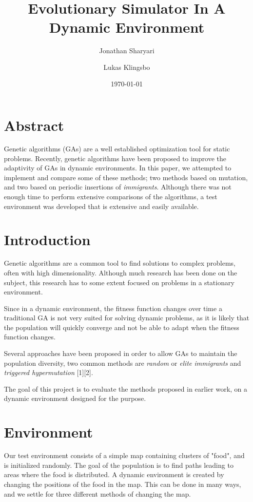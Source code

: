 \documentclass[a4paper,12pt]{article}
\title{\textbf{Evolutionary Simulator In A Dynamic Environment}}
\author{Jonathan Sharyari \and Lukas Klingsbo}  %
\date{\today}
\begin{document}
\maketitle

\section{Abstract}
Genetic algorithms (GAs) are a well established optimization tool for static problems. Recently, genetic algorithms have been proposed to improve the adaptivity of GAs in dynamic environments. In this paper, we attempted to implement and compare some of these methods; two methods based on mutation, and two based on periodic insertions of \emph{immigrants}. Although there was not enough time to perform extensive comparisons of the algorithms, a test environment was developed that is extensive and easily available.


\section{Introduction}
Genetic algorithms are a common tool to find solutions to complex problems, often with high dimensionality. Although much research has been done on the subject, this research has to some extent focused on problems in a stationary environment.

Since in a dynamic environment, the fitness function changes over time a traditional GA is not very suited for solving dynamic problems, as it is likely that the population will quickly converge and not be able to adapt when the fitness function changes.

Several approaches have been proposed in order to allow GAs to maintain the population diversity, two common methods are \emph{random} or \emph{elite immigrants} and \emph{triggered hypermutation} [1][2].

The goal of this project is to evaluate the methods proposed in earlier work, on a dynamic environment designed for the purpose.

\section{Environment}
Our test environment consists of a simple map containing clusters of "food", and is initialized randomly. The goal of the population is to find paths leading to areas where the food is distributed. A dynamic environment is created by changing the positions of the food in the map. This can be done in many ways, and we settle for three different methods of changing the map.
\end{document}
